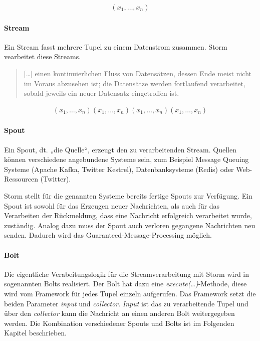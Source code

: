 \documentclass[a4paper,11pt]{scrartcl}
\begin{document}
  \begin{align*}
    (x_1, \ldots , x_n)
  \end{align*}

  \paragraph{Stream}
  Ein Stream fasst mehrere Tupel zu einem Datenstrom zusammen. Storm
  vearbeitet diese Streams.
  \begin{quote}
    [\ldots] einen kontinuierlichen Fluss von Datensätzen, dessen Ende
    meist nicht im Voraus abzusehen ist; die Datensätze werden
    fortlaufend verarbeitet, sobald jeweils ein neuer Datensatz
    eingetroffen ist.
  \end{quote}

  \begin{align*}
    (x_1, \ldots , x_n)
    (x_1, \ldots , x_n)
    (x_1, \ldots , x_n)
    (x_1, \ldots , x_n)
  \end{align*}
  \begin{figure}[!h]
    \centering
    \vspace*{-1cm}
  \end{figure}

  \paragraph{Spout}
  Ein Spout, dt. „die Quelle“, erzeugt den zu verarbeitenden Stream.
  Quellen können verschiedene angebundene Systeme sein, zum
  Beispiel Message Queuing Systeme (Apache Kafka, Twitter Kestrel),
  Datenbanksysteme (Redis) oder Web-Ressourcen (Twitter).

  Storm stellt für die genannten Systeme bereits fertige Spouts zur
  Verfügung. Ein Spout ist sowohl für das Erzeugen neuer Nachrichten,
  als auch für das Verarbeiten der Rückmeldung, dass eine Nachricht
  erfolgreich verarbeitet wurde, zuständig. Analog dazu muss der Spout
  auch verloren gegangene Nachrichten neu senden. Dadurch wird das
  Guaranteed-Message-Processing möglich.


  \paragraph{Bolt}
  Die eigentliche Verabeitungslogik für die Streamverarbeitung mit
  Storm wird in sogenannten Bolts realisiert. Der Bolt hat dazu eine
  \textit{execute(\ldots)}-Methode, diese wird vom Framework für jedes
  Tupel einzeln aufgerufen. Das Framework setzt die beiden Parameter
  \textit{input} und \textit{collector}. \textit{Input} ist das zu
  verarbeitende Tupel und über den \textit{collector} kann die
  Nachricht an einen anderen Bolt weitergegeben werden. Die
  Kombination verschiedener Spouts und Bolts ist im Folgenden Kapitel
  beschrieben.
\end{document}
